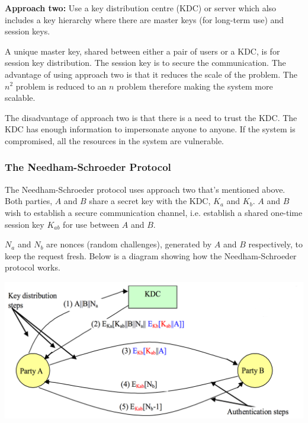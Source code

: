 \documentclass{article}
\begin{document}
\textbf{Approach two:} Use a key distribution centre (KDC) or server which also includes a key hierarchy where there are master keys (for long-term use) and session keys.

A unique master key, shared between either a pair of users or a KDC, is for session key distribution. The session key is to secure the communication. The advantage of using approach two is that it reduces the scale of the problem. The $n^{2}$ problem is reduced to an $n$ problem therefore making the system more scalable.

The disadvantage of approach two is that there is a need to trust the KDC. The KDC has enough information to impersonate anyone to anyone. If the system is compromised, all the resources in the system are vulnerable.

\subsubsection{The Needham-Schroeder Protocol}
The Needham-Schroeder protocol uses approach two that's mentioned above. Both parties, $A$ and $B$ share a secret key with the KDC, $K_{a}$ and $K_{b}$. $A$ and $B$ wish to establish a secure communication channel, i.e. establish a shared one-time session key $K_{ab}$ for use between $A$ and $B$.

$N_{a}$ and $N_{b}$ are nonces (random challenges), generated by $A$ and $B$ respectively, to keep the request fresh. Below is a diagram showing how the Needham-Schroeder protocol works.
\begin{center}
  \includegraphics[scale=0.4]{nsp.png}
\end{center}
\end{document}
